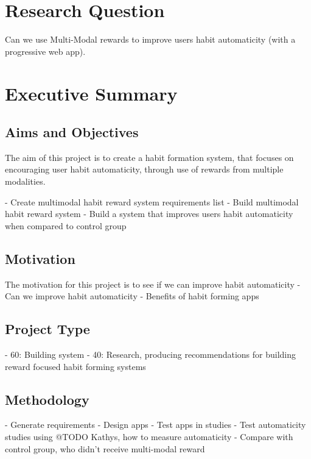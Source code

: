 
\section{Research Question}
Can we use Multi-Modal rewards to improve users habit automaticity (with a progressive web app).

\section{Executive Summary}

\subsection{Aims and Objectives}
The aim of this project is to create a habit formation system, that focuses on encouraging user habit automaticity, through use of rewards from multiple modalities.\newline

- Create multimodal habit reward system requirements list\newline
- Build multimodal habit reward system\newline
- Build a system that improves users habit automaticity when compared to control group

\subsection{Motivation}
  The motivation for this project is to see if we can improve habit automaticity\newline
  - Can we improve habit automaticity\newline
  - Benefits of habit forming apps

\subsection{Project Type}
  - 60: Building system\newline
  - 40: Research, producing recommendations for building reward focused habit forming systems

\subsection{Methodology}
  - Generate requirements\newline
  - Design apps\newline
  - Test apps in studies\newline
    - Test automaticity studies using @TODO Kathys, how to measure automaticity\newline
  - Compare with control group, who didn't receive multi-modal reward

